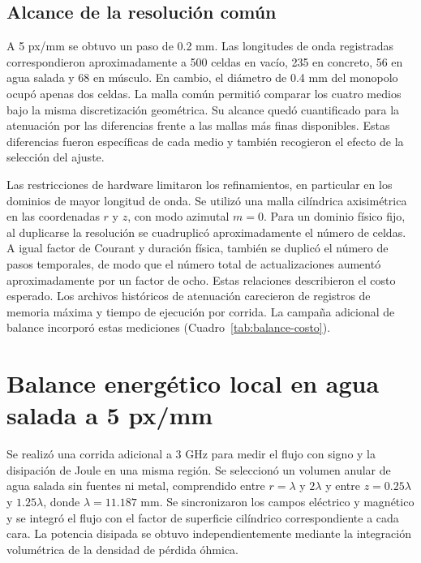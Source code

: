 \subsection{Alcance de la resolución común}
A 5 px/mm se obtuvo un paso de 0.2 mm. Las longitudes de onda registradas correspondieron aproximadamente a 500 celdas en vacío, 235 en concreto, 56 en agua salada y 68 en músculo. En cambio, el diámetro de 0.4 mm del monopolo ocupó apenas dos celdas. La malla común permitió comparar los cuatro medios bajo la misma discretización geométrica. Su alcance quedó cuantificado para la atenuación por las diferencias frente a las mallas más finas disponibles. Estas diferencias fueron específicas de cada medio y también recogieron el efecto de la selección del ajuste.

Las restricciones de hardware limitaron los refinamientos, en particular en los dominios de mayor longitud de onda. Se utilizó una malla cilíndrica axisimétrica en las coordenadas $r$ y $z$, con modo azimutal $m=0$. Para un dominio físico fijo, al duplicarse la resolución se cuadruplicó aproximadamente el número de celdas. A igual factor de Courant y duración física, también se duplicó el número de pasos temporales, de modo que el número total de actualizaciones aumentó aproximadamente por un factor de ocho. Estas relaciones describieron el costo esperado. Los archivos históricos de atenuación carecieron de registros de memoria máxima y tiempo de ejecución por corrida. La campaña adicional de balance incorporó estas mediciones (Cuadro~\ref{tab:balance-costo}).

\section{Balance energético local en agua salada a 5 px/mm}\label{sec:balance-agua-cinco}
Se realizó una corrida adicional a 3 GHz para medir el flujo con signo y la disipación de Joule en una misma región. Se seleccionó un volumen anular de agua salada sin fuentes ni metal, comprendido entre $r=\lambda$ y $2\lambda$ y entre $z=0.25\lambda$ y $1.25\lambda$, donde $\lambda=11.187$ mm. Se sincronizaron los campos eléctrico y magnético y se integró el flujo con el factor de superficie cilíndrico correspondiente a cada cara. La potencia disipada se obtuvo independientemente mediante la integración volumétrica de la densidad de pérdida óhmica.

